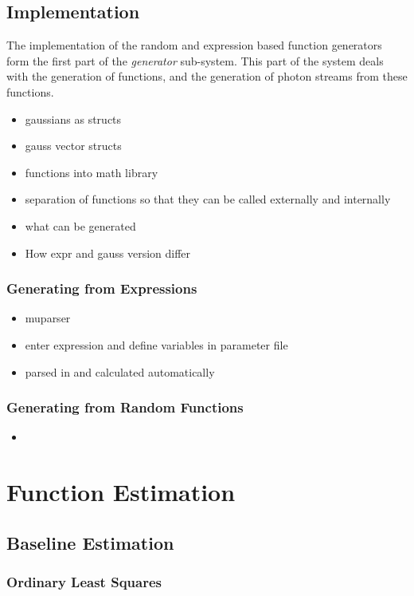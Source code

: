 \documentclass[a4paper,11pt]{article}
\begin{document}
\subsection{Implementation}
\label{sec-4-3}

    The implementation of the random and expression based function generators
    form the first part of the \emph{generator} sub-system. This part of the
    system deals with the generation of functions, and the generation of photon
    streams from these functions.
\begin{itemize}
\item gaussians as structs
\item gauss vector structs
\item functions into math library
\item separation of functions so that they can be called externally and internally
\item what can be generated
\item How expr and gauss version differ
\end{itemize}
\subsubsection{Generating from Expressions}
\label{sec-4-3-1}

\begin{itemize}
\item muparser
\item enter expression and define variables in parameter file
\item parsed in and calculated automatically
\end{itemize}
\subsubsection{Generating from Random Functions}
\label{sec-4-3-2}

\begin{itemize}
\item 
\end{itemize}
\section{Function Estimation}
\label{sec-5}
\subsection{Baseline Estimation}
\label{sec-5-1}
\subsubsection{Ordinary Least Squares}
\label{sec-5-1-1}
\end{document}
